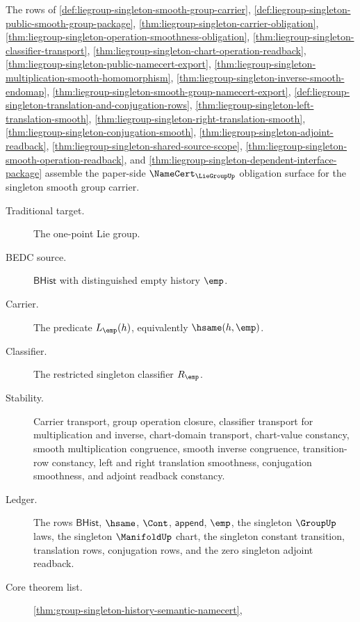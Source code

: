 \begin{theorem}
\label{thm:liegroup-singleton-namecert-obligation}
The rows of
\autoref{def:liegroup-singleton-smooth-group-carrier},
\autoref{def:liegroup-singleton-public-smooth-group-package},
\autoref{thm:liegroup-singleton-carrier-obligation},
\autoref{thm:liegroup-singleton-operation-smoothness-obligation},
\autoref{thm:liegroup-singleton-classifier-transport},
\autoref{thm:liegroup-singleton-chart-operation-readback},
\autoref{thm:liegroup-singleton-public-namecert-export},
\autoref{thm:liegroup-singleton-multiplication-smooth-homomorphism},
\autoref{thm:liegroup-singleton-inverse-smooth-endomap},
\autoref{thm:liegroup-singleton-smooth-group-namecert-export},
\autoref{def:liegroup-singleton-translation-and-conjugation-rows},
\autoref{thm:liegroup-singleton-left-translation-smooth},
\autoref{thm:liegroup-singleton-right-translation-smooth},
\autoref{thm:liegroup-singleton-conjugation-smooth},
\autoref{thm:liegroup-singleton-adjoint-readback},
\autoref{thm:liegroup-singleton-shared-source-scope},
\autoref{thm:liegroup-singleton-smooth-operation-readback}, and
\autoref{thm:liegroup-singleton-dependent-interface-package} assemble the
paper-side $\NameCert_{\LieGroupUp}$ obligation surface for the singleton
smooth group carrier.
\begin{description}
\item[Traditional target.] The one-point Lie group.
\item[BEDC source.] $\mathsf{BHist}$ with distinguished empty history $\emp$.
\item[Carrier.] The predicate $L_{\emp}(h)$, equivalently $\hsame(h,\emp)$.
\item[Classifier.] The restricted singleton classifier $R_{\emp}$.
\item[Stability.] Carrier transport, group operation closure, classifier
transport for multiplication and inverse, chart-domain transport, chart-value
constancy, smooth multiplication congruence, smooth inverse congruence,
transition-row constancy, left and right translation smoothness, conjugation
smoothness, and adjoint readback constancy.
\item[Ledger.] The rows $\mathsf{BHist}$, $\hsame$, $\Cont$,
$\mathsf{append}$, $\emp$, the singleton $\GroupUp$ laws, the singleton
$\ManifoldUp$ chart, the singleton constant transition, translation rows,
conjugation rows, and the zero singleton adjoint readback.
\item[Core theorem list.]
\autoref{thm:group-singleton-history-semantic-namecert},

\end{description}
\end{theorem}
